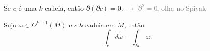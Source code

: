 \vspace{-1cm}
\begin{exercise}
    Se \(c\) é uma $k$-cadeia, então \(\partial (\partial c) = 0 \). \textcolor{gray}{\(\rightarrow\) \(\partial^2 = 0\), olha no Spivak}  
\end{exercise}

\begin{theorem}
    Seja \(\omega \in \Omega^{k-1}(M)\) e \(c\) $k$-cadeia em \(M\), então
    \[\int_c d\omega = \int_{\partial c } \omega.\]
\end{theorem}